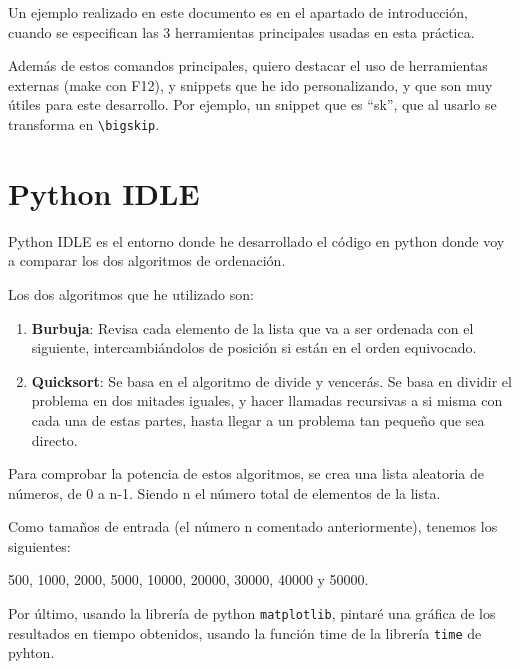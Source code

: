 \documentclass[a4,12pt]{article}
\begin{document}
Un ejemplo realizado en este documento es en el apartado de introducción, cuando se especifican las 3 herramientas principales usadas en esta práctica.

\bigskip
Además de estos comandos principales, quiero destacar el uso de herramientas externas (make con F12), y snippets que he ido personalizando, y que son muy útiles para este desarrollo. Por ejemplo, un snippet que es ``sk'', que al usarlo se transforma en \verb+\bigskip+.

\newpage
\section{Python IDLE}
Python IDLE es el entorno donde he desarrollado el código en python donde voy a comparar los dos algoritmos de ordenación.

\bigskip
\noindent Los dos algoritmos que he utilizado son:
\begin{enumerate}

\item \textbf{Burbuja}: Revisa cada elemento de la lista que va a ser ordenada con el siguiente, intercambiándolos de posición si están en el orden equivocado.

\item \textbf{Quicksort}: Se basa en el algoritmo de divide y vencerás. Se basa en dividir el problema en dos mitades iguales, y hacer llamadas recursivas a si misma con cada una de estas partes, hasta llegar a un problema tan pequeño que sea directo.
\end{enumerate}

\noindent Para comprobar la potencia de estos algoritmos, se crea una lista aleatoria de números, de 0 a n-1. Siendo n el número total de elementos de la lista.

\bigskip
Como tamaños de entrada (el número n comentado anteriormente), tenemos los siguientes:

500, 1000, 2000, 5000, 10000, 20000, 30000, 40000 y 50000.

\bigskip
Por último, usando la librería de python \texttt{matplotlib}, pintaré una gráfica de los resultados en tiempo obtenidos, usando la función time de la librería \texttt{time} de pyhton.
\end{document}
